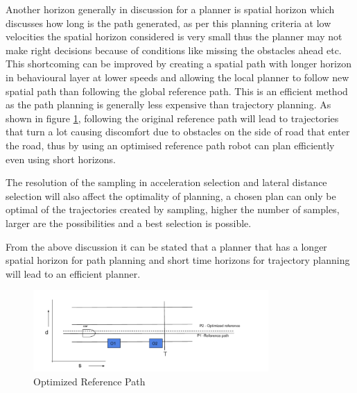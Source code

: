  Another horizon generally in discussion for a planner is spatial horizon which discusses how long is the path generated, as per this planning criteria at low velocities the spatial horizon considered is very small thus the planner may not make right decisions because of conditions like missing the obstacles ahead etc. This shortcoming can be improved by creating a spatial path with longer horizon in behavioural layer at lower speeds and allowing the local planner to follow new spatial path than following the global reference path. This is an efficient method as the path planning is generally less expensive than trajectory planning. As shown in figure \ref{optimized_reference}, following the original reference path will lead to trajectories that turn a lot causing discomfort due to obstacles on the side of road that enter the road, thus by using an optimised reference path robot can plan efficiently even using short horizons.
 
 The resolution of the sampling in acceleration selection and lateral distance selection will also affect the optimality of planning, a chosen plan can only be optimal of the trajectories created by sampling, higher the number of samples, larger are the possibilities and a best selection is possible. 
 
 From the above discussion it can be stated that a planner that has a longer spatial horizon for path planning and short time horizons for trajectory planning will lead to an efficient planner. 
 
 \begin{figure}[H]
    \centering
    \includegraphics[width=0.8\textwidth]{Images/optimized_reference.png}
    \caption{Optimized Reference Path}
    \label{optimized_reference}
\end{figure}

